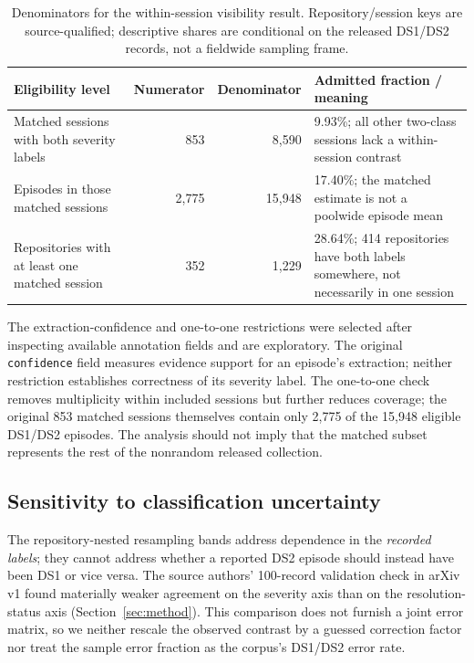 \begin{table}[htbp]
\centering\small
\caption{Denominators for the within-session visibility result. Repository/session keys are source-qualified; descriptive shares are conditional on the released DS1/DS2 records, not a fieldwide sampling frame.}
\label{tab:matched-coverage}
\begin{tabularx}{\textwidth}{@{}YrrY@{}}
\toprule
\textbf{Eligibility level} & \textbf{Numerator} & \textbf{Denominator} & \textbf{Admitted fraction / meaning}\\
\midrule
Matched sessions with both severity labels & 853 & 8,590 & 9.93\%; all other two-class sessions lack a within-session contrast\\
Episodes in those matched sessions & 2,775 & 15,948 & 17.40\%; the matched estimate is not a poolwide episode mean\\
Repositories with at least one matched session & 352 & 1,229 & 28.64\%; 414 repositories have both labels somewhere, not necessarily in one session\\
\bottomrule
\end{tabularx}
\end{table}

The extraction-confidence and one-to-one restrictions were selected after inspecting available annotation fields and are exploratory. The original \texttt{confidence} field measures evidence support for an episode's extraction; neither restriction establishes correctness of its severity label. The one-to-one check removes multiplicity within included sessions but further reduces coverage; the original 853 matched sessions themselves contain only 2,775 of the 15,948 eligible DS1/DS2 episodes. The analysis should not imply that the matched subset represents the rest of the nonrandom released collection.


\subsection{Sensitivity to classification uncertainty}
The repository-nested resampling bands address dependence in the \emph{recorded labels}; they cannot address whether a reported DS2 episode should instead have been DS1 or vice versa. The source authors' 100-record validation check in arXiv v1 found materially weaker agreement on the severity axis than on the resolution-status axis (Section~\ref{sec:method}). This comparison does not furnish a joint error matrix, so we neither rescale the observed contrast by a guessed correction factor nor treat the sample error fraction as the corpus's DS1/DS2 error rate.

